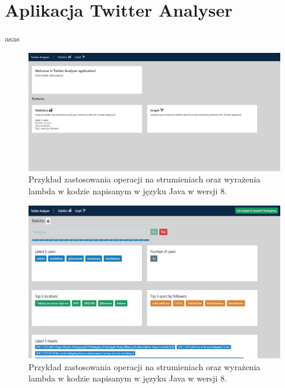 \chapter{Aplikacja Twitter Analyser}
\qquad asas

\begin{figure}[h] %
	\centering
	\includegraphics[width=1.0\linewidth]{img/twitter_analyser_1}
	\caption{Przykład zastosowania operacji na strumieniach oraz wyrażenia lambda w kodzie napisanym w języku Java w wersji 8.}
\end{figure}

\begin{figure}[h] %
	\centering
	\includegraphics[width=1.0\linewidth]{img/twitter_analyser_thanks_giving_2}
	\caption{Przykład zastosowania operacji na strumieniach oraz wyrażenia lambda w kodzie napisanym w języku Java w wersji 8.}
\end{figure}

